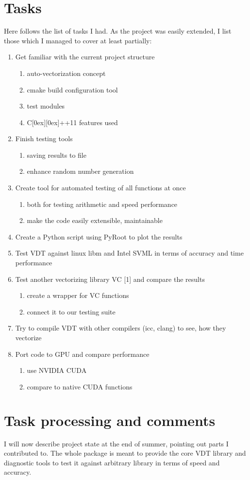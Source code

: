 \documentclass[oneside,10pt,a4paper]{article}
\newcommand{\beE}{\begin{enumerate}}
\newcommand{\enE}{\end{enumerate}}
\newcommand{\Cpp}{C\raisebox{0.15ex}[0ex][0ex]{++}}
\begin{document}
\section{Tasks}
Here follows the list of tasks I had. As the project was easily extended, I list those which I managed to cover at least partially:
\beE
    \item Get familiar with the current project structure
        \beE
            \item auto-vectorization concept
            \item cmake build configuration tool
            \item test modules
            \item \Cpp 11 features used
        \enE
    \item Finish testing tools
        \beE
            \item saving results to file
            \item enhance random number generation
        \enE
    \item Create tool for automated testing of all functions at once
        \beE
            \item both for testing arithmetic and speed performance
            \item make the code easily extensible, maintainable
        \enE
    \item Create a Python script using PyRoot to plot the results
    \item Test VDT against linux libm and Intel SVML in terms of accuracy and time performance
    \item Test another vectorizing library VC [1] and compare the results
        \beE
            \item create a wrapper for VC functions
            \item connect it to our testing suite
        \enE
    \item Try to compile VDT with other compilers (icc, clang) to see, how they vectorize
    \item Port code to GPU and compare performance
        \beE
            \item use NVIDIA CUDA
            \item compare to native CUDA functions
        \enE
\enE

\section{Task processing and comments}
I will now describe project state at the end of summer, pointing out parts I contributed to. The whole package is meant to provide the core VDT library and diagnostic tools to test it against arbitrary library in terms of speed and accuracy.
\end{document}
